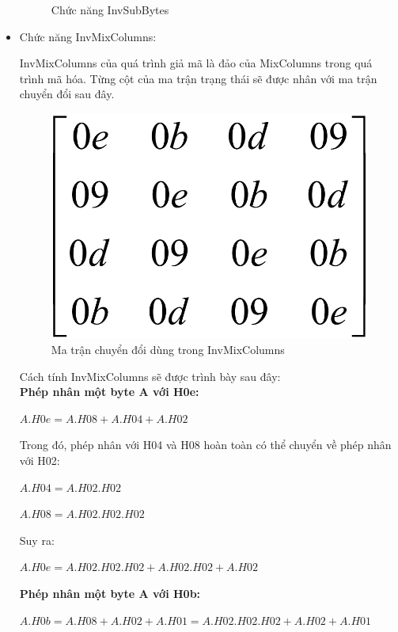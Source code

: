 \begin{itemize}
\begin{figure}[H]
    \caption{Chức năng InvSubBytes}
\end{figure}
\item Chức năng InvMixColumns:

InvMixColumns của quá trình giả mã là đảo của MixColumns trong quá trình mã hóa. Từng cột của ma trận trạng thái sẽ được nhân với ma trận chuyển đổi sau đây.\cite{fips2001197}

\begin{figure}[H]
    \centering
    \includegraphics[scale=0.2]{pic/huê/Ma trận chuyển đổi dùng trong InvMixColumns.png}
    
    \caption{Ma trận chuyển đổi dùng trong InvMixColumns}
\end{figure}

Cách tính InvMixColumns sẽ được trình bày sau đây: \\

\textbf{Phép nhân một byte A với H0e:}
\begin{center}
    $A.H0e = A.H08 + A.H04 + A.H02$
\end{center}

    Trong đó, phép nhân với H04 và H08 hoàn toàn có thể chuyển về phép nhân với H02:
\begin{center}
    $A.H04 = A.H02.H02$
    
$A.H08 = A.H02.H02.H02 $
\end{center}
    
Suy ra: 
\begin{center}
    $A.H0e = A.H02.H02.H02 + A.H02.H02 + A.H02 $
\end{center}

\textbf{Phép nhân một byte A với H0b:}
\begin{center}
    $A.H0b = A.H08 + A.H02 + A.H01 = A.H02.H02.H02 + A.H02 + A.H01 $
\end{center}


\end{itemize}
